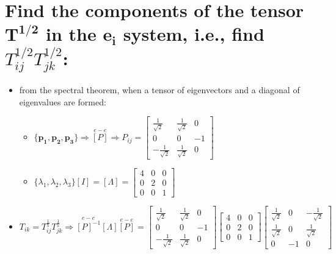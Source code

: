 \documentclass[10pt, letterpaper]{article}
\begin{document}
\section{Find the components of the tensor $\bm{T^{1/2}}$ in the $\bm{e_i}$ system, i.e., find $T^{1/2}_{ij} T^{1/2}_{jk}$:}
	\begin{itemize}
	\item from the spectral theorem, when a tensor of eigenvectors and a diagonal of eigenvalues are formed:
		\begin{itemize} 
			\item$\{\bm{p_1},\bm{ p_2}, \bm{p_3}\} \Rightarrow \overset{e-e}{[P]} \Rightarrow P_{ij} =\begin{bmatrix} 
					\frac{1}{\sqrt{2}} & \frac{1}{\sqrt{2}} & 0 \\
					0& 0 & -1 \\
					-\frac{1}{\sqrt{2}} & \frac{1}{\sqrt{2}} & 0
				\end{bmatrix} $
			 \item $\{\lambda_1, \lambda_2, \lambda_3\} [I] = [\Lambda] = \begin{bmatrix} 4 & 0 & 0 \\
			 															0 & 2 & 0 \\
																		0 & 0 & 1
																	\end{bmatrix}$
		\end{itemize}
	\item $T_{ik} = T_{ij}^{\frac{1}{2}} T_{jk}^{\frac{1}{2}} \Rightarrow \overset{e-e}{[P]^{-1}} [\Lambda] \overset{e-e}{[P]} = 
			\begin{bmatrix} 
				\frac{1}{\sqrt{2}} & \frac{1}{\sqrt{2}} & 0 \\
				0& 0 & -1 \\
				-\frac{1}{\sqrt{2}} & \frac{1}{\sqrt{2}} & 0
			\end{bmatrix} 
			\begin{bmatrix}
				 4 & 0 & 0 \\
				0 & 2 & 0 \\
				0 & 0 & 1
			\end{bmatrix}		
			\begin{bmatrix} 
				\frac{1}{\sqrt{2}} & 0 & -\frac{1}{\sqrt{2}} \\
				\frac{1}{\sqrt{2}} & 0 & \frac{1}{\sqrt{2}} \\
				0 & -1 & 0
			\end{bmatrix}$
	\end{itemize}
	
\end{document}
